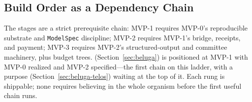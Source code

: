 \subsection{Build Order as a Dependency Chain}

The stages are a strict prerequisite chain: MVP-1 requires MVP-0's reproducible substrate and \texttt{ModelSpec} discipline; MVP-2 requires MVP-1's bridge, receipts, and payment; MVP-3 requires MVP-2's structured-output and committee machinery, plus budget trees. \Beluga{} (Section~\ref{sec:beluga}) is positioned at MVP-1 with MVP-0 realized and MVP-2 specified---the first chain on this ladder, with a purpose (Section~\ref{sec:beluga-telos}) waiting at the top of it. Each rung is shippable; none requires believing in the whole organism before the first useful chain runs.

